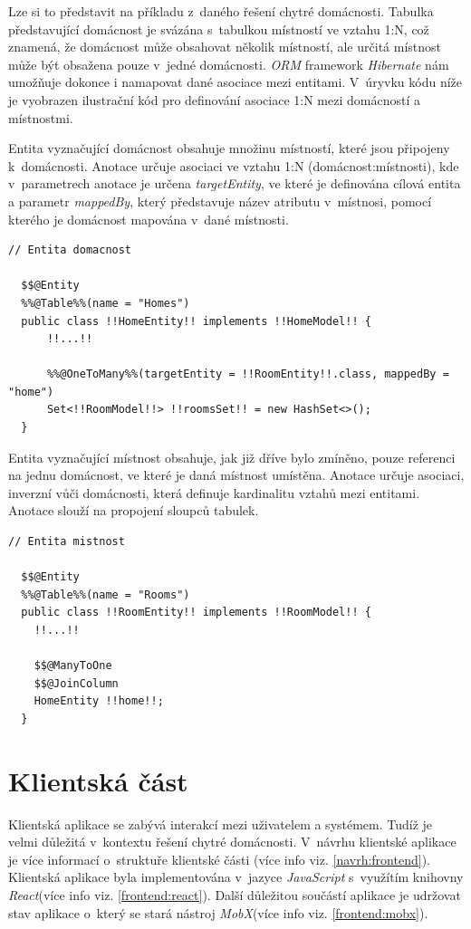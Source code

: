 Lze si to představit na příkladu z~daného řešení chytré domácnosti.
Tabulka představující domácnost je svázána s~tabulkou místností ve vztahu 1:N, což znamená, že domácnost může obsahovat několik místností, ale určitá místnost může být obsažena pouze v~jedné domácnosti.
\emph{ORM} framework \emph{Hibernate} nám umožňuje dokonce i namapovat dané asociace mezi entitami.
V~úryvku kódu níže je vyobrazen ilustrační kód pro definování asociace 1:N mezi domácností a místnostmi.

Entita vyznačující domácnost obsahuje množinu místností, které jsou připojeny k~domácnosti.
Anotace  určuje asociaci ve vztahu 1:N (domácnost:místnosti), kde v~parametrech anotace je určena \emph{targetEntity}, ve které je definována cílová entita a
parametr \emph{mappedBy}, který představuje název atributu v~místnosi, pomocí kterého je domácnost mapována v~dané místnosti.

\begin{lstlisting}[style=JavaStyle, caption={Ukázka asociace 1:N (domácnost:místnosti)}]
  // Entita domacnost
  
  $$@Entity
  %%@Table%%(name = "Homes")
  public class !!HomeEntity!! implements !!HomeModel!! {
      !!...!!

      %%@OneToMany%%(targetEntity = !!RoomEntity!!.class, mappedBy = "home")
      Set<!!RoomModel!!> !!roomsSet!! = new HashSet<>();
  }
\end{lstlisting}

Entita vyznačující místnost obsahuje, jak již dříve bylo zmíněno, pouze referenci na jednu domácnost, ve které je daná místnost umístěna.
Anotace  určuje asociaci, inverzní vůči domácnosti, která definuje kardinalitu vztahů mezi entitami.
Anotace  slouží na propojení sloupců tabulek.

\begin{lstlisting}[style=JavaStyle,caption={Ukázka asociace 1:N (domácnost:místnosti)}]
  // Entita mistnost
  
  $$@Entity
  %%@Table%%(name = "Rooms")
  public class !!RoomEntity!! implements !!RoomModel!! {
    !!...!!

    $$@ManyToOne
    $$@JoinColumn
    HomeEntity !!home!!;
  }
\end{lstlisting}

\newpage
\section{Klientská část}
\label{impl:frontend}
Klientská aplikace se zabývá interakcí mezi uživatelem a systémem.
Tudíž je velmi důležitá v~kontextu řešení chytré domácnosti.
V~návrhu klientské aplikace je více informací o~struktuře klientské části (více info viz. \ref{navrh:frontend}).
Klientská aplikace byla implementována v~jazyce \emph{JavaScript} s~využítím knihovny \emph{React}(více info viz. \ref{frontend:react}).
Další důležitou součástí aplikace je udržovat stav aplikace o~který se stará nástroj \emph{MobX}(více info viz. \ref{frontend:mobx}).

